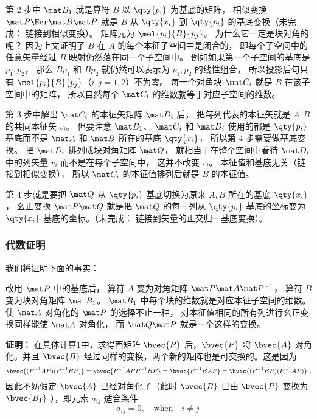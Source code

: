 第 2 步中 $\mat B_1$ 就是算符 $B$ 以 $\qty{p_i}$ 为基底的矩阵， 相似变换 $\mat P\Her \mat B\mat P$ 就是 $B$ 从 $\qty{x_i}$ 到 $\qty{p_i}$ 的基底变换（未完成： 链接到相似变换）。 矩阵元为 $\mel{p_i}{B}{p_j}$。 为什么它一定是块对角的呢？ 因为上文证明了 $B$ 在 $A$ 的每个本征子空间中是闭合的， 即每个子空间中的任意矢量经过 $B$ 映射仍然落在同一个子空间中。 例如如果第一个子空间的基底是 $p_1, p_2$， 那么 $B p_1$ 和 $B p_2$ 就仍然可以表示为 $p_1, p_2$ 的线性组合， 所以投影后句只有 $\mel{p_i}{B}{p_j}$（$i,j=1,2$）不为零。 每一个对角块 $\mat C_i$ 就是 $B$ 在该子空间中的矩阵， 所以自然每个 $\mat C_i$ 的维数就等于对应子空间的维数。

第 3 步中解出 $\mat C_i$ 的本征矢矩阵 $\mat D_i$ 后， 把每列代表的本征矢就是 $A, B$ 的共同本征矢 $v_i$。 但要注意 $\mat B_1$、 $\mat C_i$ 和 $\mat D_i$ 使用的都是 $\qty{p_i}$ 基底而不是 $\mat A$ 和 $\mat B$ 所在的基底 $\qty{x_i}$， 所以第 4 步需要做基底变换。 把 $\mat D_i$ 排列成块对角矩阵 $\mat Q$， 就相当于在整个空间中看待 $\mat D_i$ 中的列矢量 $v_i$ 而不是在每个子空间中， 这并不改变 $v_i$。 本征值和基底无关（链接到相似变换）， 所以 $\mat C_i$ 的本征值排列后就是 $B$ 的本征值。

第 4 步就是要把 $\mat Q$ 从 $\qty{p_i}$ 基底切换为原来 $A, B$ 所在的基底 $\qty{x_i}$， 幺正变换 $\mat P\mat Q$ 就是把 $\mat Q$ 的每一列从 $\qty{p_i}$ 基底的坐标变为 $\qty{x_i}$ 基底的坐标。（未完成： 链接到矢量的正交归一基底变换）。


\subsubsection{代数证明}
我们将证明下面的事实：

改用 $\mat P$ 中的基底后， 算符 $A$ 变为对角矩阵 $\mat P \mat A\mat P^{-1}$， 算符 $B$ 变为块对角矩阵 $\mat B_1$。 $\mat B_1$ 中每个块的维数就是对应本征子空间的维数。 使 $\mat A$ 对角化的 $\mat P$ 的选择不止一种， 对本征值相同的所有列进行幺正变换同样能使 $\mat A$ 对角化， 而 $\mat Q\mat P$ 就是一个这样的变换。

\textbf{证明：}
在具体计算1中，求得酉矩阵 $\bvec{P}$ 后，$\bvec{P}$ 将 $\bvec{A}$ 对角化。并且 $\bvec{B}$ 经过同样的变换，两个新的矩阵也是可交换的。这是因为
\begin{equation}
\bvec{(P^{-1}AP)(P^{-1}BP)}=\bvec{P^{-1}APP^{-1}BP}=\bvec{P^{-1}BAP}=\bvec{(P^{-1}BP)(P^{-1}AP)}~,
\end{equation}
因此不妨假定 $\bvec{A}$ 已经对角化了（此时 $\bvec{B}$ 已由 $\bvec{P}$ 变换为 $\bvec{B_1}$ ），即元素 $a_{ij}$ 适合条件
\begin{equation}
a_{ij}=0,\quad \mathrm{when} \quad i\neq j
\label{eq_Commut_25}~
\end{equation}

